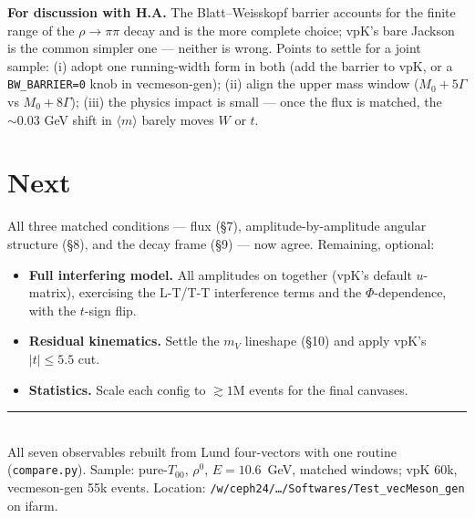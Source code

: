 \documentclass[11pt]{article}
\begin{document}
\textbf{For discussion with H.A.} The Blatt--Weisskopf barrier accounts for the finite range of the
$\rho\to\pi\pi$ decay and is the more complete choice; vpK's bare Jackson is the common simpler one --- neither
is wrong. Points to settle for a joint sample: (i) adopt one running-width form in both (add the barrier to
vpK, or a \texttt{BW\_BARRIER=0} knob in vecmeson-gen); (ii) align the upper mass window ($M_0+5\Gamma$ vs
$M_0+8\Gamma$); (iii) the physics impact is small --- once the flux is matched, the $\sim0.03$ GeV shift in
$\langle m\rangle$ barely moves $W$ or $t$.

\section{Next}
All three matched conditions --- flux (\S7), amplitude-by-amplitude angular structure (\S8), and the decay
frame (\S9) --- now agree. Remaining, optional:
\begin{itemize}[leftmargin=1.2em,itemsep=3pt]
\item \textbf{Full interfering model.} All amplitudes on together (vpK's default $u$-matrix), exercising the
L-T/T-T interference terms and the $\Phi$-dependence, with the $t$-sign flip.
\item \textbf{Residual kinematics.} Settle the $m_V$ lineshape (\S10) and apply vpK's $|t|\le5.5$ cut.
\item \textbf{Statistics.} Scale each config to $\gtrsim1$M events for the final canvases.
\end{itemize}

\vspace{0.5em}
{\color{rulec}\rule{\linewidth}{0.6pt}}\\[0.3em]
{\footnotesize All seven observables rebuilt from Lund four-vectors with one routine (\texttt{compare.py}).
Sample: pure-$T_{00}$, $\rho^0$, $E=10.6$~GeV, matched windows; vpK 60k, vecmeson-gen 55k events. Location:
\texttt{/w/ceph24/\ldots/Softwares/Test\_vecMeson\_gen} on ifarm.}
\end{document}
